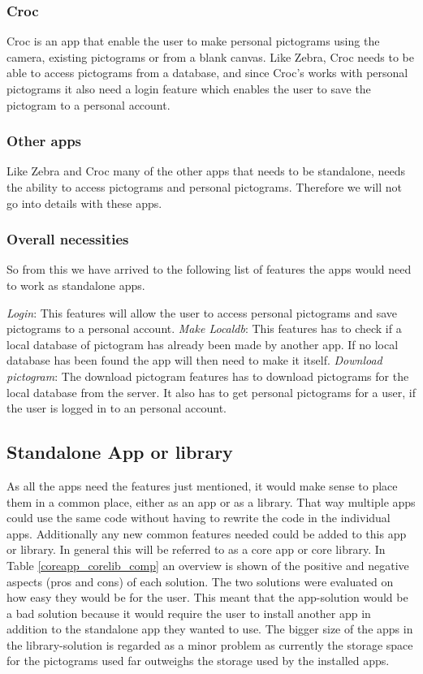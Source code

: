 \subsubsection{Croc}
Croc is an app that enable the user to make personal pictograms using the camera, existing pictograms or from a blank canvas. Like Zebra, Croc needs to be able to access pictograms from a database, and since Croc’s works with personal pictograms it also need a login feature which enables the user to save the pictogram to a personal account.
\subsubsection{Other apps}
Like Zebra and Croc many of the other apps that needs to be standalone, needs the ability to access pictograms and personal pictograms. Therefore we will not go into details with these apps.
\subsubsection{Overall necessities}
So from this we have arrived to the following list of features the apps would need to work as standalone apps. 

\textit{Login}:
This features will allow the user to access personal pictograms and save pictograms to a personal account.
\textit{Make Localdb}:
This features has to check if a local database of pictogram has already been made by another app. If no local database has been found the app will then need to make it itself. 
\textit{Download pictogram}:
The download pictogram features has to download pictograms for the local database from the server. It also has to get personal pictograms for a user, if the user is logged in to an personal account.


\subsection{Standalone App or library}
As all the apps need the features just mentioned, it would make sense to place them in a common place, either as an app or as a library. That way multiple apps could use the same code without having to rewrite the code in the individual apps. Additionally any new common features needed could be added to this app or library. In general this will be referred to as a core app or core library.
In Table \ref{coreapp_corelib_comp} an overview is shown of the positive and negative aspects (pros and cons) of each solution. The two solutions were evaluated on how easy they would be for the user. This meant that the app-solution would be a bad solution because it would require the user to install another app in addition to the standalone app they wanted to use. The bigger size of the apps in the library-solution is regarded as a minor problem as currently the storage space for the pictograms used far outweighs the storage used by the installed apps.

